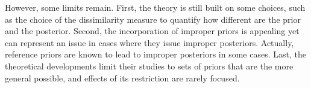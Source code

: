 

However, some limits remain. 
First, the theory is still built on some choices, such as the choice of the dissimilarity measure to quantify how different are the prior and the posterior.
Second, the incorporation of improper priors is appealing yet can represent an issue in cases where they issue improper posteriors. Actually, reference priors are known to lead to improper posteriors in some cases.
Last, the theoretical developments limit their studies to sets of priors that are the more general possible, and effects of its restriction are rarely focused.







\newpage
\thispagestyle{plain}




